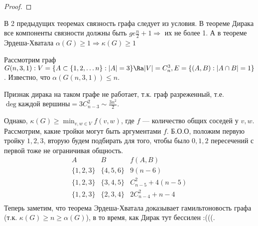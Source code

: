 \begin{proof}
\end{proof}

\begin{note}
    В 2 предыдущих теоремах связность графа следует из условия. В теореме Дирака все компоненты связности должны быть \(ge \frac{n}{2} + 1 \Longrightarrow \) их не более 1. А в теореме Эрдеша-Хватала \(\alpha(G) \ge 1 \Longrightarrow \kappa(G) \ge 1\)
\end{note}

\begin{example}
    Рассмотрим граф \(G(n, 3, 1): V = \{A \subset \{1, 2, \dots n\}: |A| = 3\} \Ra |V| = C_n^3, E = \{(A, B): |A \cap B| = 1\}\). Известно, что \(\alpha(G(n, 3, 1)) \le n\).

    Признак дирака на таком графе не работает, т.к. граф разреженный, т.е. \(\deg \text{каждой вершины} = 3C_{n - 3}^2 \sim \frac{3n^2}{2}\).

    Однако, \(\kappa(G) \ge \min_{v, w \in V} f(v, w)\), где \(f\) --- количество общих соседей у \(v, w\). Рассмотрим, какие тройки могут быть аргументами \(f\). Б.О.О, положим первую тройку \(1, 2, 3\), вторую будем подбирать для того, чтобы было \(0, 1, 2\) пересечений с первой тоже не ограничивая общность.
    \[\begin{array}{c|c|c}
        A & B & f(A, B) \\
        \hline
        \{1, 2, 3\} & \{4, 5, 6\} & 9(n - 6) \\ 
        \{1, 2, 3\} & \{3, 4, 5\} & C_{n - 5}^2 + 4(n - 5) \\ 
        \{1, 2, 3\} & \{2, 3, 4\} & 2C_{n - 4}^2 + n - 4 \\ 
    \end{array}\]
    Теперь заметим, что теорема Эрдеша-Хватала доказывает гамильтоновость графа (т.к. \(\kappa(G) \ge n \ge \alpha(G)\)), в то время, как Дирак тут бессилен :(((.
\end{example}

